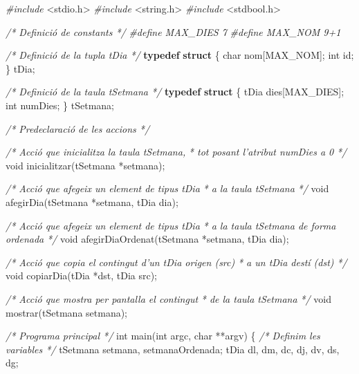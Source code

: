 \documentclass[]{book}
\newenvironment{Shaded}{\begin{snugshade}}{\end{snugshade}}
\newcommand{\KeywordTok}[1]{\textcolor[rgb]{0.13,0.29,0.53}{\textbf{#1}}}
\newcommand{\DataTypeTok}[1]{\textcolor[rgb]{0.13,0.29,0.53}{#1}}
\newcommand{\ImportTok}[1]{#1}
\newcommand{\CommentTok}[1]{\textcolor[rgb]{0.56,0.35,0.01}{\textit{#1}}}
\newcommand{\PreprocessorTok}[1]{\textcolor[rgb]{0.56,0.35,0.01}{\textit{#1}}}
\newcommand{\NormalTok}[1]{#1}
\begin{document}
\begin{Shaded}
\begin{Highlighting}[]
\PreprocessorTok{#include }\ImportTok{<stdio.h>}
\PreprocessorTok{#include }\ImportTok{<string.h>}
\PreprocessorTok{#include }\ImportTok{<stdbool.h>}

\CommentTok{/* Definició de constants */}
\PreprocessorTok{#define MAX_DIES 7}
\PreprocessorTok{#define MAX_NOM 9+1}

\CommentTok{/* Definició de la tupla tDia */}
\KeywordTok{typedef} \KeywordTok{struct}\NormalTok{ \{}
    \DataTypeTok{char}\NormalTok{ nom[MAX_NOM];}
    \DataTypeTok{int}\NormalTok{ id;}
\NormalTok{\} tDia;}

\CommentTok{/* Definició de la taula tSetmana */}
\KeywordTok{typedef} \KeywordTok{struct}\NormalTok{ \{}
\NormalTok{    tDia dies[MAX_DIES];}
    \DataTypeTok{int}\NormalTok{ numDies;}
\NormalTok{\} tSetmana;}

\CommentTok{/* Predeclaració de les accions */}

\CommentTok{/* Acció que inicialitza la taula tSetmana,}
\CommentTok{ * tot posant l'atribut numDies a 0 }
\CommentTok{ */}
\DataTypeTok{void}\NormalTok{ inicialitzar(tSetmana *setmana);}

\CommentTok{/* Acció que afegeix un element de tipus tDia}
\CommentTok{ * a la taula tSetmana }
\CommentTok{ */}
\DataTypeTok{void}\NormalTok{ afegirDia(tSetmana *setmana, tDia dia);}

\CommentTok{/* Acció que afegeix un element de tipus tDia}
\CommentTok{ * a la taula tSetmana de forma ordenada }
\CommentTok{ */}
\DataTypeTok{void}\NormalTok{ afegirDiaOrdenat(tSetmana *setmana, tDia dia);}

\CommentTok{/* Acció que copia el contingut d'un tDia origen (src)}
\CommentTok{ * a un tDia destí (dst) }
\CommentTok{ */}
\DataTypeTok{void}\NormalTok{ copiarDia(tDia *dst, tDia src);}

\CommentTok{/* Acció que mostra per pantalla el contingut}
\CommentTok{ * de la taula tSetmana }
\CommentTok{ */}
\DataTypeTok{void}\NormalTok{ mostrar(tSetmana setmana);}

\CommentTok{/* Programa principal */}
\DataTypeTok{int}\NormalTok{ main(}\DataTypeTok{int}\NormalTok{ argc, }\DataTypeTok{char}\NormalTok{ **argv)}
\NormalTok{\{}
    \CommentTok{/* Definim les variables */}
\NormalTok{    tSetmana setmana, setmanaOrdenada;}
\NormalTok{    tDia dl, dm, dc, dj, dv, ds, dg; }
    

\end{Highlighting}
\end{Shaded}
\end{document}
